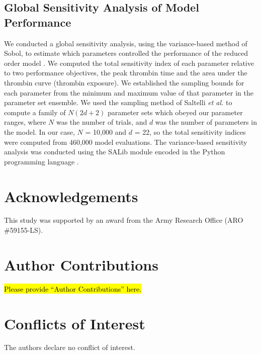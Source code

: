 \documentclass[processes,article,received,moreauthors,pdftex,12pt,a4paper]{mdpi}
\begin{document}
\subsection{Global Sensitivity Analysis of Model Performance}

We conducted a global sensitivity analysis, using the variance-based method of Sobol, to estimate which parameters controlled the performance of the reduced order model \citep{SOBOL_METHOD}. 
We computed the total sensitivity index of each parameter relative to two performance objectives, the peak thrombin time and the area under the thrombin curve (thrombin exposure).
We established the sampling bounds for each parameter from the minimum and maximum value of that parameter in the parameter set ensemble. 
We used the sampling method of Saltelli \textit{et al.} \citep{Saltelli:2010} to compute a family of $N\left(2d+2\right)$ parameter sets which obeyed our parameter ranges, 
where $N$ was the number of trials, and $d$ was the number of parameters in the model. In our case, $N$ = 10,000 and $d$ = 22, so the total sensitivity indices were computed from
460,000 model evaluations. The variance-based sensitivity analysis was conducted using the SALib module encoded in the Python programming language \citep{SALIB}.

\section*{\noindent  Acknowledgements}
\vspace{12pt}

This study was supported by an award from the Army Research Office (ARO \#59155-LS).

\section*{\noindent Author Contributions}
\vspace{12pt}

\hl{Please provide ``Author Contributions'' here. }


\section*{\noindent Conflicts of Interest}
\vspace{12pt}

The authors declare no conflict of interest.
\end{document}
